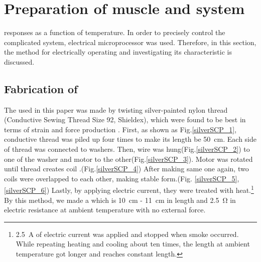 \section{Preparation of muscle and system}\label{section_preparation}
\scp responses as a function of temperature. In order to precisely control the complicated system, electrical microprocessor was used. Therefore, in this section, the method for electrically operating \scp and investigating its characteristic is discussed. 

\subsection{Fabrication of \scp}
The \scp used in this paper was made by twisting silver-painted nylon thread (Conductive Sewing Thread Size 92, Shieldex), which were found to be best in terms of strain and force production \cite{haines}. First, as shown as Fig.\ref{silverSCP_1}, conductive thread was piled up four times to make its length be \SI{50}{\centi\meter}. Each side of thread was connected to washers. Then, wire was hung(Fig.\ref{silverSCP_2}) to one of the washer and motor to the other(Fig.\ref{silverSCP_3}). Motor was rotated until thread creates coil \cite{fab_coil}.(Fig.\ref{silverSCP_4}) After making same one again, two coils were overlapped to each other, making stable form.(Fig. \ref{silverSCP_5},\ref{silverSCP_6}) Lastly, by applying electric current, they were treated with heat.\footnote{\SI{2.5}{\ampere} of electric current was applied and stopped when smoke occurred. While repeating heating and cooling about ten times, the length at ambient temperature got longer and reaches constant length.} By this method, we made a \scp which is \SI{10}{\centi\meter} - \SI{11}{\centi\meter} in length and \SI{2.5}{\ohm} in electric resistance at ambient temperature with no external force.

